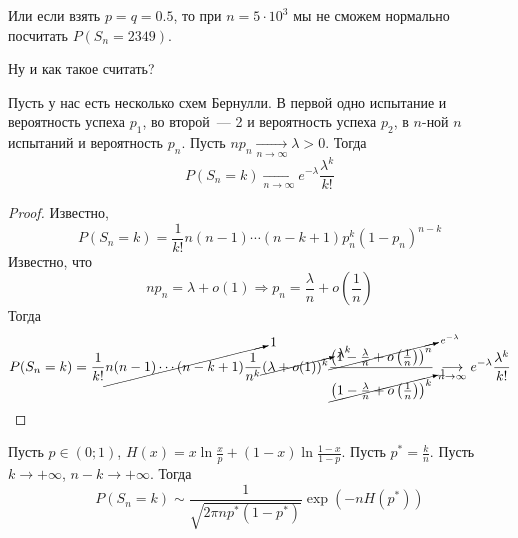 \documentclass{article}
\begin{document}
    \begin{example}
        Или если взять $p=q=0.5$, то при $n=5\cdot10^3$ мы не сможем нормально посчитать $P(S_n=2349)$.
    \end{example}
    \begin{remark}
        Ну и как такое считать?
    \end{remark}
    \begin{theorem}
        Пусть у нас есть несколько схем Бернулли. В первой одно испытание и вероятность успеха $p_1$, во второй~--- 2 и вероятность успеха $p_2$, в $n$-ной $n$ испытаний и вероятность $p_n$. Пусть $np_n\underset{n\to\infty}\longrightarrow\lambda>0$. Тогда
        $$
        P(S_n=k)\underset{n\to\infty}\longrightarrow e^{-\lambda}\frac{\lambda^k}{k!}
        $$
    \end{theorem}
    \begin{proof}
        Известно,
        $$
        P(S_n=k)=\frac1{k!}n(n-1)\cdots(n-k+1)p_n^k(1-p_n)^{n-k}
        $$
        Известно, что
        $$
        np_n=\lambda+o(1)\Rightarrow p_n=\frac\lambda n+o\left(\frac1n\right)
        $$
        Тогда
        $$
        P(S_n=k)=\frac1{k!}\cancelto1{n(n-1)\cdots(n-k+1)\frac1{n^k}}\cancelto{\lambda^k}{(\lambda+o(1))^k}\frac{\cancelto{e^{-\lambda}}{\left(1-\frac\lambda n+o\left(\frac1n\right)\right)^n}}{\cancelto1{\left(1-\frac\lambda n+o\left(\frac1n\right)\right)^k}}\underset{n\to\infty}\longrightarrow e^{-\lambda}\frac{\lambda^k}{k!}
        $$
    \end{proof}
    \begin{lemma}
        Пусть $p\in(0;1)$, $H(x)=x\ln\frac xp+(1-x)\ln\frac{1-x}{1-p}$. Пусть $p^*=\frac kn$. Пусть $k\rightarrow+\infty$, $n-k\rightarrow+\infty$. Тогда
        $$
        P(S_n=k)\sim\frac1{\sqrt{2\pi np^*(1-p^*)}}\exp(-nH(p^*))
        $$
    \end{lemma}
\end{document}

